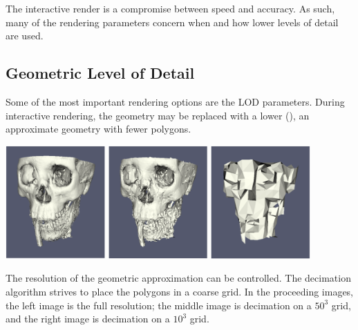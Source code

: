 The interactive render is a compromise between speed and accuracy.  As
such, many of the rendering parameters concern when and how lower levels of
detail are used.

\subsection{Geometric Level of Detail}

Some of the most important rendering options are the LOD parameters.
During interactive rendering, the geometry may be replaced with a lower
 (), an approximate geometry with
fewer polygons.

\begin{inlinefig}
  \includegraphics[width=1.5in]{images/GeometricLODFull}
  \includegraphics[width=1.5in]{images/GeometricLOD50}
  \includegraphics[width=1.5in]{images/GeometricLOD10}
\end{inlinefig}

The resolution of the geometric approximation can be controlled.  The
decimation algorithm strives to place the polygons in a coarse grid.  In
the proceeding images, the left image is the full resolution; the middle
image is decimation on a $50^3$ grid, and the right image is decimation on
a $10^3$ grid.

